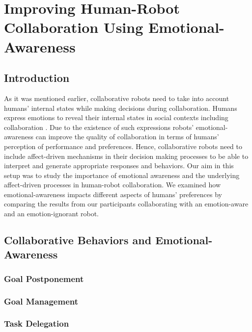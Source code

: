 \documentclass[12pt]{report}
\begin{document}
\chapter{Improving Human-Robot Collaboration Using Emotional-Awareness}
\label{ch:awareness}

\section{Introduction}

As it was mentioned earlier, collaborative robots need to take into account
humans' internal states while making decisions during collaboration. Humans
express emotions to reveal their internal states in social contexts including
collaboration \cite{breazeal:sociable-interactive-robots}. Due to the existence
of such expressions robots' emotional-awareness can improve the quality of
collaboration in terms of humans' perception of performance and preferences.
Hence, collaborative robots need to include affect-driven mechanisms in their
decision making processes to be able to interpret and generate appropriate
responses and behaviors. Our aim in this setup was to study the importance of
emotional awareness and the underlying affect-driven processes in human-robot
collaboration. We examined how emotional-awareness impacts different aspects of
humans' preferences by comparing the results from our participants collaborating
with an emotion-aware and an emotion-ignorant robot.

\section{Collaborative Behaviors and Emotional-Awareness}

\subsection{Goal Postponement}

\subsection{Goal Management}

\subsection{Task Delegation}
\end{document}
